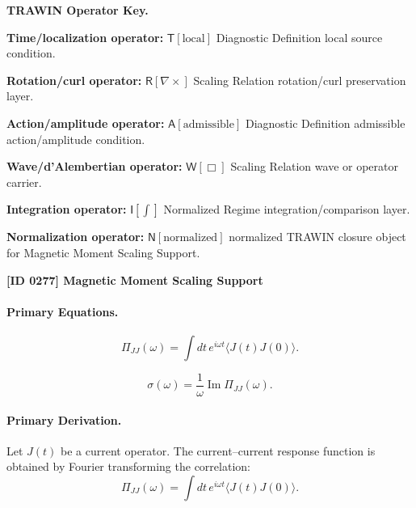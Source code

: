\par\vspace{0.45\baselineskip}
\noindent\begin{minipage}[t]{\linewidth}
\begingroup
\small
\raggedright
\textbf{TRAWIN Operator Key.}\par
\noindent\textbf{Time/localization operator:} $\mathsf{T}\!\left[\mathrm{local}\right]$ Diagnostic Definition local source condition.\par
\noindent\textbf{Rotation/curl operator:} $\mathsf{R}\!\left[\nabla\times\right]$ Scaling Relation rotation/curl preservation layer.\par
\noindent\textbf{Action/amplitude operator:} $\mathsf{A}\!\left[\mathrm{admissible}\right]$ Diagnostic Definition admissible action/amplitude condition.\par
\noindent\textbf{Wave/d'Alembertian operator:} $\mathsf{W}\!\left[\Box\right]$ Scaling Relation wave or operator carrier.\par
\noindent\textbf{Integration operator:} $\mathsf{I}\!\left[\int\right]$ Normalized Regime integration/comparison layer.\par
\noindent\textbf{Normalization operator:} $\mathsf{N}\!\left[\mathrm{normalized}\right]$ normalized TRAWIN closure object for Magnetic Moment Scaling Support.\par
\endgroup
\end{minipage}

\clearpage
\noindent\textbf{[ID 0277] Magnetic Moment Scaling Support}\par
\vspace{0.35em}
\paragraph{Primary Equations.}
\begin{equation}
\Pi_{JJ}(\omega)
=
\int
dt\,
e^{i\omega t}
\langle J(t)J(0)\rangle .
\end{equation}

\begin{equation}
\sigma(\omega)
=
\frac{1}{\omega}
\operatorname{Im}\Pi_{JJ}(\omega).
\end{equation}

\paragraph{Primary Derivation.}
Let $J(t)$ be a current operator.  
The current--current response function is obtained by Fourier transforming the correlation:
\begin{equation}
\Pi_{JJ}(\omega)
=
\int
dt\,
e^{i\omega t}
\langle J(t)J(0)\rangle .
\end{equation}

